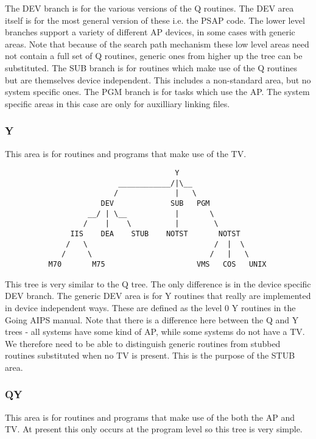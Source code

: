The DEV branch is for the various versions of the Q routines. The DEV
area itself is for the most general version of these i.e. the PSAP code.
The lower level branches support a variety of different AP devices, in
some cases with generic areas. Note that because of the search path
mechanism these low level areas need not contain a full set of Q
routines, generic ones from higher up the tree can be substituted. The
SUB branch is for routines which make use of the Q routines but are
themselves device independent. This includes a non-standard area, but no
system specific ones. The PGM branch is for tasks which use the AP. The
system specific areas in this case are only for auxilliary linking files.

\subsubsection{ Y }

This area is for routines and programs that make use of the TV.

\begin{verbatim}
                                       Y
                          ____________/|\__
                         /             |   \
                      DEV             SUB   PGM
                   __/ | \__           |       \
                  /    |    \          |        \
               IIS    DEA    STUB    NOTST       NOTST
              /   \                             /  |  \
             /     \                           /   |   \
          M70       M75                     VMS   COS   UNIX
\end{verbatim}

This tree is very similar to the Q tree. The only difference is in the
device specific DEV branch. The generic DEV area is for Y routines that
really are implemented in device independent ways. These are defined as
the level 0 Y routines in the Going AIPS manual. Note that there is a
difference here between the Q and Y trees - all systems have some kind
of AP, while some systems do not have a TV. We therefore need to be able
to distinguish generic routines from stubbed routines substituted when
no TV is present. This is the purpose of the STUB area.

\subsubsection{ QY }

This area is for routines and programs that make use of the both the AP
and TV. At present this only occurs at the program level so this tree
is very simple.

